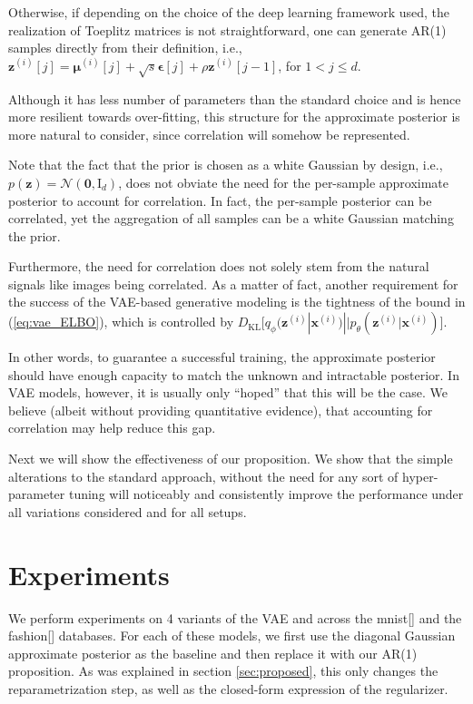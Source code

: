\documentclass{article}
\begin{document}
Otherwise, if depending on the choice of the deep learning framework used, the realization of Toeplitz matrices is not straightforward, one can generate AR(1) samples directly from their definition, i.e., $\mathbf{z}^{(i)}[j] = \boldsymbol{\mu}^{(i)}[j] + \sqrt{s} \boldsymbol{\epsilon}[j] + \rho \mathbf{z}^{(i)}[j-1]$, for $1 < j \leqslant d$.

Although it has less number of parameters than the standard choice and is hence more resilient towards over-fitting, this structure for the approximate posterior is more natural to consider, since correlation will somehow be represented. 

Note that the fact that the prior is chosen as a white Gaussian by design, i.e., $p(\mathbf{z}) = \mathcal{N}(\mathbf{0}, \mathrm{I}_d)$, does not obviate the need for the per-sample approximate posterior to account for correlation. In fact, the per-sample posterior can be correlated, yet the aggregation of all samples can be a white Gaussian matching the prior.

Furthermore, the need for correlation does not solely stem from the natural signals like images being correlated. As a matter of fact, another requirement for the success of the VAE-based generative modeling is the tightness of the bound in (\ref{eq:vae_ELBO}), which is controlled by $D_{\text{KL}}\big[ q_{\phi}(\mathbf{z}^{(i)}  | \mathbf{x}^{(i)}) || p_{\theta}(\mathbf{z}^{(i)} | \mathbf{x}^{(i)}) \big]$.

In other words, to guarantee a successful training, the approximate posterior should have enough capacity to match the unknown and intractable posterior. In VAE models, however, it is usually only ``hoped'' that this will be the case. We believe (albeit without providing quantitative evidence), that accounting for correlation may help reduce this gap.

Next we will show the effectiveness of our proposition. We show that the simple alterations to the standard approach, without the need for any sort of hyper-parameter tuning will noticeably and consistently improve the performance under all variations considered and for all setups. 

\section{Experiments} \label{sec:exp} 

We perform experiments on 4 variants of the VAE and across the mnist[] and the fashion[] databases. For each of these models, we first use the diagonal Gaussian approximate posterior as the baseline and then replace it with our AR(1) proposition. As was explained in section \ref{sec:proposed}, this only changes the reparametrization step, as well as the closed-form expression of the regularizer.
\end{document}
